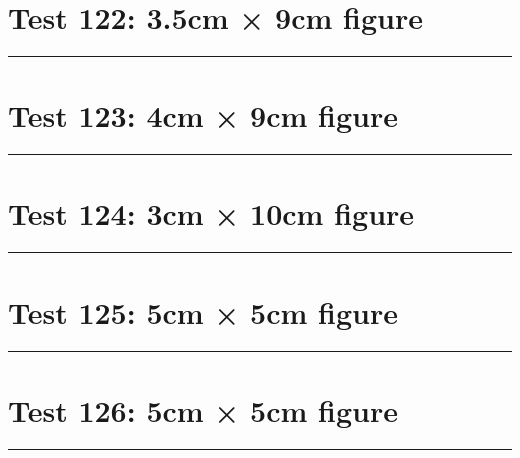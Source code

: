 \documentclass[a4paper,11pt]{article}
\begin{document}
\section*{Test 122: 3.5cm × 9cm figure}
\begin{swarmwrap}%
  \begin{minipage}[t]{3cm}
    \centering
    \rule{\linewidth}{9cm}
  \end{minipage}%
\end{swarmwrap}%
\swarmwrapnext
\lipsum[56]
\lipsum[57]
\lipsum[58]
\lipsum[59]
\lipsum[60]
\lipsum[61]
\section*{Test 123: 4cm × 9cm figure}
\begin{swarmwrap}%
  \begin{minipage}[t]{4cm}
    \centering
    \rule{\linewidth}{9cm}
  \end{minipage}%
\end{swarmwrap}%
\swarmwrapnext
\lipsum[23]
\lipsum[24]
\lipsum[25]
\lipsum[26]
\section*{Test 124: 3cm × 10cm figure}
\begin{swarmwrap}%
  \begin{minipage}[t]{3cm}
    \centering
    \rule{\linewidth}{10cm}
  \end{minipage}%
\end{swarmwrap}%
\swarmwrapnext
\lipsum[25]
\lipsum[26]
\lipsum[27]
\lipsum[28]
\lipsum[29]
\section*{Test 125: 5cm × 5cm figure}
\begin{swarmwrap}%
  \begin{minipage}[t]{5cm}
    \centering
    \rule{\linewidth}{5cm}
  \end{minipage}%
\end{swarmwrap}%
\swarmwrapnext
\lipsum[59]
\lipsum[60]
\lipsum[61]
\lipsum[62]
\lipsum[63]
\section*{Test 126: 5cm × 5cm figure}
\begin{swarmwrap}%
  \begin{minipage}[t]{5cm}
    \centering
    \rule{\linewidth}{5cm}
  \end{minipage}%
\end{swarmwrap}%
\swarmwrapnext
\lipsum[8]
\lipsum[9]
\lipsum[10]
\lipsum[11]
\end{document}
